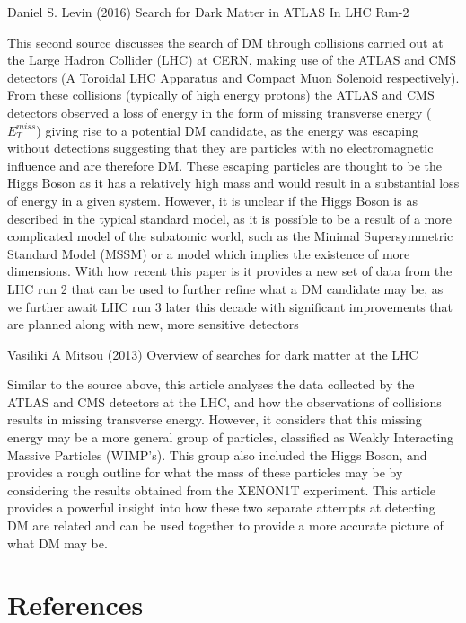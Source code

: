 \documentclass[]{article}
\begin{document}
\noindent 
 [2] Daniel S. Levin (2016) Search for Dark Matter in ATLAS In LHC Run-2
\par
This second source discusses the search of DM through collisions carried out at the Large 
Hadron Collider (LHC) at CERN, making use of the ATLAS and CMS detectors 
(A Toroidal LHC Apparatus and Compact Muon Solenoid respectively).
From these collisions (typically of high energy protons) the ATLAS and CMS detectors
observed a loss of energy in the form of missing transverse energy ($E^{miss}_{T} $)
giving rise to a potential DM candidate, as the energy was escaping without 
detections suggesting that they are particles with no electromagnetic influence 
and are therefore DM. These escaping particles are thought to be the Higgs Boson 
as it has a relatively high mass and would result in a substantial loss of energy
in a given system. However, it is unclear if the Higgs Boson is as 
described in the typical standard model, as it is possible to be a result of a more 
complicated model of the subatomic world, such as the Minimal Supersymmetric Standard Model (MSSM)
or a model which implies the existence of more dimensions. With how recent this paper 
is it provides a new set of data from the LHC run 2 that can be used to further refine 
what a DM candidate may be, as we further await LHC run 3 later this decade with 
significant improvements that are planned along with new, more sensitive detectors\parskip 0.2cm 

\noindent 
 [5] Vasiliki A Mitsou (2013) Overview of searches for dark matter at the LHC
\par
Similar to the source above, this article analyses the data collected by the
ATLAS and CMS detectors at the LHC, and how the observations of collisions results in
missing transverse energy. However, it considers that this missing energy may be
a more general group of particles, classified as Weakly Interacting Massive Particles (WIMP's).
This group also included the Higgs Boson, and provides a rough outline for what 
the mass of these particles may be by considering the results obtained 
from the XENON1T experiment. This article provides a powerful insight into how these
two separate attempts at detecting DM are related and can be used together 
to provide a more accurate picture of what DM may be.



\section*{References}
\end{document}
